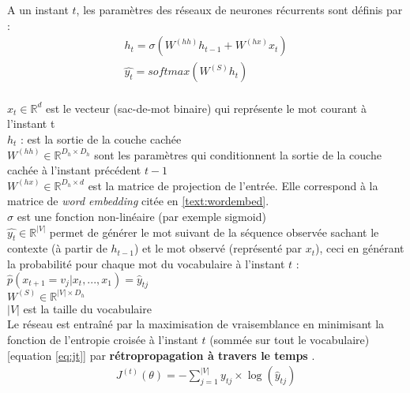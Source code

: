 A un instant $t$, les paramètres des réseaux de neurones récurrents sont définis par :
\begin{eqnarray}
h_{t} = \sigma(W^{(hh)} h_{t-1} + W^{(hx)} x_{t})\\
\hat{y_{t}} = softmax(W^{(S)} h_{t})
\end{eqnarray}\\
$ x_{t} \in \mathbb{R}^{d}$ est le vecteur (sac-de-mot binaire) qui représente le mot courant à l'instant t\\
$h_{t}$ : est la sortie de la couche cachée\\
	$W^{(hh)} \in \mathbb{R}^{D_{h}\times D_{h}}$ sont les paramètres qui conditionnent la sortie de la couche cachée à l'instant précédent $t-1$\\
	$W^{(hx)}\in \mathbb{R}^{D_{h}\times d}$  est la matrice de projection de l'entrée. Elle correspond à la matrice de \textit{word embedding} citée en \ref{text:wordembed}.\\
	$\sigma$ est une fonction non-linéaire (par exemple sigmoid)\\
$\hat{y_{t}} \in \mathbb{R}^{|V|}$ permet de générer le mot suivant de la séquence observée sachant le contexte (à partir de $h_{t-1}$) et le mot observé (représenté par $x_{t}$), ceci en générant la probabilité pour chaque mot du vocabulaire à l'instant $t$ :$ \hat{p}(x_{t+1}=v_{j}|x_{t},...,x_{1})= \hat{y}_{tj}$\\
	$W^{(S)} \in \mathbb{R}^{|V| \times D_{h}}$\\
$|V|$ est la taille du vocabulaire\\
Le réseau est entraîné par la maximisation de vraisemblance en minimisant la fonction de l'entropie croisée à l'instant $t$ (sommée sur tout le vocabulaire)[equation \ref{eq:jt}]  par  \textbf{rétropropagation à travers le temps} \cite{werbos1990backpropagation}.
\begin{eqnarray}
\label{eq:jt}
J^{(t)}(\theta) = -\sum_{j=1}^{\left | V \right |}y_{tj}\times \log(\hat{y}_{tj})
\end{eqnarray}



